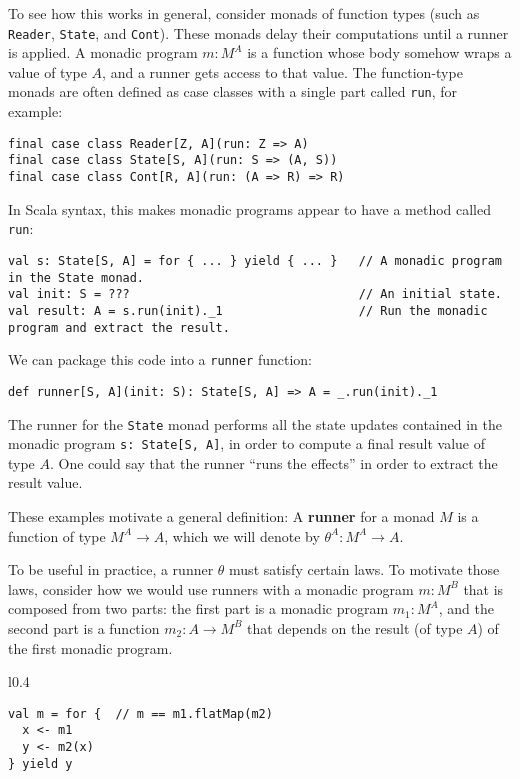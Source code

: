 To see how this works in general, consider monads of function types
(such as \lstinline!Reader!, \lstinline!State!, and \lstinline!Cont!).
These monads delay their computations until a runner is applied. A
monadic program $m:M^{A}$ is a function whose body somehow wraps
a value of type $A$, and a runner gets access to that value. The
function-type monads are often defined as case classes with a single
part called \lstinline!run!, for example:
\begin{lstlisting}
final case class Reader[Z, A](run: Z => A)
final case class State[S, A](run: S => (A, S))
final case class Cont[R, A](run: (A => R) => R)
\end{lstlisting}
In Scala syntax, this makes monadic programs appear to have a method
called \lstinline!run!:
\begin{lstlisting}
val s: State[S, A] = for { ... } yield { ... }   // A monadic program in the State monad.
val init: S = ???                                // An initial state.
val result: A = s.run(init)._1                   // Run the monadic program and extract the result.
\end{lstlisting}
We can package this code into a \lstinline!runner! function:
\begin{lstlisting}
def runner[S, A](init: S): State[S, A] => A = _.run(init)._1
\end{lstlisting}
The runner for the \lstinline!State! monad performs all the state
updates contained in the monadic program \lstinline!s: State[S, A]!,
in order to compute a final result value of type $A$. One could say
that the runner \textsf{``}runs the effects\textsf{''} in order to extract the result
value.

These examples motivate a general definition: A \textbf{runner}
for a monad $M$ is a function of type $M^{A}\rightarrow A$, which
we will denote by $\theta^{A}:M^{A}\rightarrow A$.

To be useful in practice, a runner $\theta$ must satisfy certain
laws. To motivate those laws, consider how we would use runners with
a monadic program $m:M^{B}$ that is composed from two parts: the
first part is a monadic program $m_{1}:M^{A}$, and the second part
is a function $m_{2}:A\rightarrow M^{B}$ that depends on the result
(of type $A$) of the first monadic program.

\begin{wrapfigure}{l}{0.4\columnwidth}%
\vspace{-0.85\baselineskip}

\begin{lstlisting}
val m = for {  // m == m1.flatMap(m2)
  x <- m1
  y <- m2(x)
} yield y
\end{lstlisting}
\vspace{-0.6\baselineskip}
\end{wrapfigure}%

